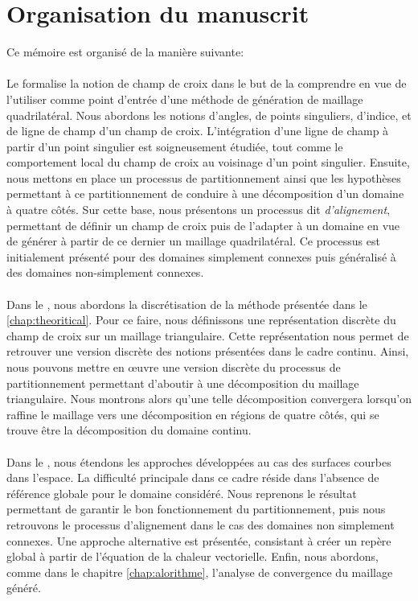 \section{Organisation du manuscrit}
Ce mémoire est organisé de la manière suivante:\\\\
Le \textbf{} formalise la notion de champ de croix dans le but de la comprendre en vue de l'utiliser comme point d'entrée d'une méthode de génération de maillage quadrilatéral. Nous abordons les notions d'angles, de points singuliers, d'indice, et de ligne de champ d'un champ de croix. L'intégration d'une ligne de champ à partir d'un point singulier est soigneusement étudiée, tout comme le comportement local du champ de croix au voisinage d'un point singulier. Ensuite, nous mettons en place un processus de partitionnement ainsi que les hypothèses permettant à ce partitionnement de conduire à une décomposition d'un domaine à quatre côtés. Sur cette base, nous présentons un processus dit \emph{d'alignement}, permettant de définir un champ de croix puis de l'adapter à un domaine en vue de générer à partir de ce dernier un maillage quadrilatéral. Ce processus est initialement présenté pour des domaines simplement connexes puis généralisé à des domaines non-simplement connexes.\\\\
Dans le \textbf{}, nous abordons la discrétisation de la méthode présentée dans le  \ref{chap:theoritical}. Pour ce faire, nous définissons une représentation discrète du champ de croix sur un maillage triangulaire. Cette représentation nous permet de retrouver une version discrète des notions présentées dans le cadre continu. Ainsi, nous pouvons mettre en œuvre une version discrète du processus de partitionnement permettant d'aboutir à une décomposition du maillage triangulaire. Nous montrons alors qu'une telle décomposition convergera lorsqu'on raffine le maillage vers une décomposition en régions de quatre côtés, qui se trouve être la décomposition du domaine continu.\\\\
Dans le \textbf{}, nous étendons les approches développées au cas des surfaces courbes dans l'espace. La difficulté principale dans ce cadre réside dans l'absence de référence globale pour le domaine considéré. Nous reprenons le résultat permettant de garantir le bon fonctionnement du partitionnement, puis nous retrouvons le processus d'alignement dans le cas des domaines non simplement connexes. Une approche alternative est présentée, consistant à créer un repère global à partir de l'équation de la chaleur vectorielle. Enfin, nous abordons, comme dans le chapitre \ref{chap:alorithme}, l'analyse de convergence du maillage généré.

